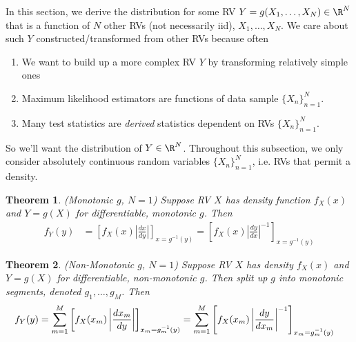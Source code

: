 \documentclass[12pt]{article}
\theoremstyle{plain}
\newtheorem{thm}{Theorem}[section]
\theoremstyle{definition}
\theoremstyle{remark}
\newcommand{\nN}{_{n=1}^N}
\begin{document}
In this section, we derive the distribution for some RV
$Y = g(X_1, \ldots, X_N)\in\R^N$
that is a function of $N$ other RVs (not necessarily iid),
$X_1,\ldots,X_N$.
We care about such $Y$ constructed/transformed from other RVs because
often
\begin{enumerate}
  \item We want to build up a more complex RV $Y$ by transforming
    relatively simple ones
  \item Maximum likelihood estimators are functions of data
    sample $\{X_n\}\nN$.
  \item Many test statistics are \emph{derived} statistics dependent on
    RVs $\{X_n\}\nN$.
\end{enumerate}
So we'll want the distribution of $Y\in\R^N$.
Throughout this subsection, we only consider absolutely continuous
random variables $\{X_n\}\nN$, i.e. RVs that permit a density.

\begin{thm}\emph{(Monotonic $g$, $N=1$)}
Suppose RV $X$ has density function $f_X(x)$ and $Y=g(X)$
for differentiable, \emph{monotonic} $g$. Then
\begin{align*}
   f_Y(y) &= \left[f_X(x) \left\lvert \frac{dx}{dy}\right\rvert
      \right]_{x = g^{-1}(y)}
    = \left[ f_X(x) \left\lvert \frac{dy}{dx}\right\rvert^{-1}
      \right]_{x = g^{-1}(y)}
\end{align*}
\end{thm}

\begin{thm}\emph{(Non-Monotonic $g$, $N=1$)}
Suppose RV $X$ has density $f_X(x)$ and $Y=g(X)$
for differentiable, \emph{non-monotonic} $g$. Then split up $g$ into
monotonic segments, denoted $g_1,\ldots,g_M$. Then
\begin{align}
   \label{nonmontrans}
   f_Y(y)
   &= \sum_{m=1}^M \left[ f_X(x_m) \left\lvert \frac{dx_m}{dy}
      \right\rvert \right]_{x_m=g_m^{-1}(y)}
   = \sum_{m=1}^M \left[ f_X(x_m) \left\lvert \frac{dy}{dx_m}
    \right\rvert^{-1} \right]_{x_m=g_m^{-1}(y)}
    \notag
\end{align}
\end{thm}
\end{document}
